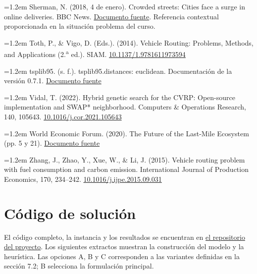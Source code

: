 \documentclass[11pt,a4paper]{article}
\numberwithin{equation}{section}
\begin{document}
{\small\hangindent=1.2em Sherman, N. (2018, 4 de enero). Crowded streets: Cities face a surge in online deliveries. BBC News. \href{https://www.bbc.com/news/business-42245367}{Documento fuente}. Referencia contextual proporcionada en la situación problema del curso.\par}

{\small\hangindent=1.2em Toth, P., \& Vigo, D. (Eds.). (2014). Vehicle Routing: Problems, Methods, and Applications (2.\textsuperscript{a} ed.). SIAM. \href{https://doi.org/10.1137/1.9781611973594}{10.1137/1.9781611973594}\par}

{\small\hangindent=1.2em tsplib95. (s. f.). tsplib95.distances: euclidean. Documentación de la versión 0.7.1. \href{https://tsplib95.readthedocs.io/en/stable/_modules/tsplib95/distances.html}{Documento fuente}\par}

{\small\hangindent=1.2em Vidal, T. (2022). Hybrid genetic search for the CVRP: Open-source implementation and SWAP* neighborhood. Computers \& Operations Research, 140, 105643. \href{https://doi.org/10.1016/j.cor.2021.105643}{10.1016/j.cor.2021.105643}\par}

{\small\hangindent=1.2em World Economic Forum. (2020). The Future of the Last-Mile Ecosystem (pp. 5 y 21). \href{https://www3.weforum.org/docs/WEF_Future_of_the_last_mile_ecosystem.pdf}{Documento fuente}\par}

{\small\hangindent=1.2em Zhang, J., Zhao, Y., Xue, W., \& Li, J. (2015). Vehicle routing problem with fuel consumption and carbon emission. International Journal of Production Economics, 170, 234--242. \href{https://doi.org/10.1016/j.ijpe.2015.09.031}{10.1016/j.ijpe.2015.09.031}\par}

\clearpage

\appendix

\section{Código de solución}

El código completo, la instancia y los resultados se encuentran en \href{https://github.com/Leo-issacs/cvrp-logistica-urbana}{el repositorio del proyecto}. Los siguientes extractos muestran la construcción del modelo y la heurística. Las opciones A, B y C corresponden a las variantes definidas en la sección 7.2; B selecciona la formulación principal.
\end{document}

